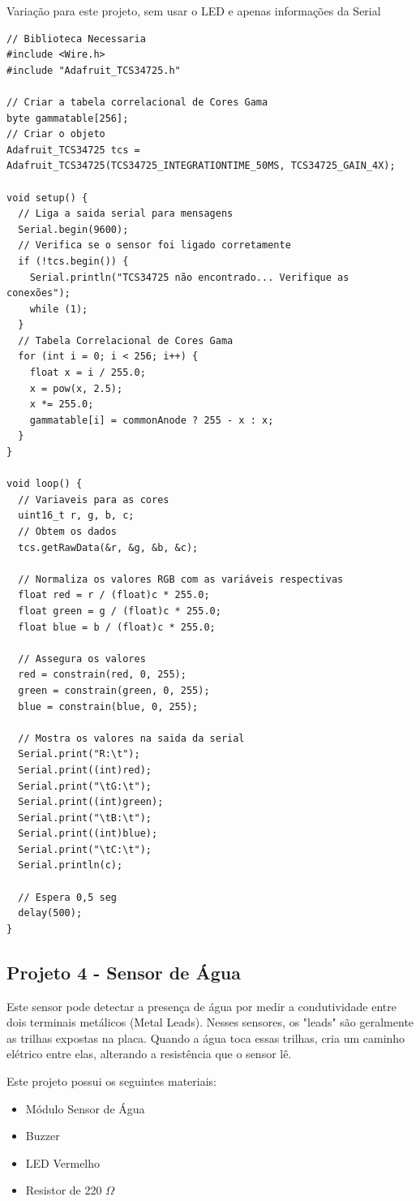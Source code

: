 \documentclass[a4paper,11pt]{article}
\begin{document}
Variação para este projeto, sem usar o LED e apenas informações da Serial

\begin{lstlisting}
// Biblioteca Necessaria	
#include <Wire.h>
#include "Adafruit_TCS34725.h"

// Criar a tabela correlacional de Cores Gama
byte gammatable[256];
// Criar o objeto
Adafruit_TCS34725 tcs = Adafruit_TCS34725(TCS34725_INTEGRATIONTIME_50MS, TCS34725_GAIN_4X);

void setup() {
  // Liga a saida serial para mensagens
  Serial.begin(9600);
  // Verifica se o sensor foi ligado corretamente	
  if (!tcs.begin()) {
    Serial.println("TCS34725 não encontrado... Verifique as conexões");
	while (1);
  }
  // Tabela Correlacional de Cores Gama
  for (int i = 0; i < 256; i++) {
	float x = i / 255.0;
	x = pow(x, 2.5);
	x *= 255.0;
	gammatable[i] = commonAnode ? 255 - x : x;
  }
}

void loop() {
  // Variaveis para as cores	
  uint16_t r, g, b, c;
  // Obtem os dados
  tcs.getRawData(&r, &g, &b, &c);

  // Normaliza os valores RGB com as variáveis respectivas
  float red = r / (float)c * 255.0;
  float green = g / (float)c * 255.0;
  float blue = b / (float)c * 255.0;

  // Assegura os valores
  red = constrain(red, 0, 255);
  green = constrain(green, 0, 255);
  blue = constrain(blue, 0, 255);

  // Mostra os valores na saida da serial
  Serial.print("R:\t");
  Serial.print((int)red);
  Serial.print("\tG:\t");
  Serial.print((int)green);
  Serial.print("\tB:\t");
  Serial.print((int)blue);
  Serial.print("\tC:\t");
  Serial.println(c);

  // Espera 0,5 seg
  delay(500);
}	
\end{lstlisting}

\subsection{Projeto 4 - Sensor de Água}
Este sensor pode detectar a presença de água por medir a condutividade entre dois terminais metálicos (Metal Leads). Nesses sensores, os "leads" são geralmente as trilhas expostas na placa. Quando a água toca essas trilhas, cria um caminho elétrico entre elas, alterando a resistência que o sensor lê.

Este projeto possui os seguintes materiais: \vspace{-1em}
\begin{itemize}
	\item Módulo Sensor de Água
	\item Buzzer
	\item LED Vermelho
	\item Resistor de 220 $\Omega$
\end{itemize}
\end{document}
